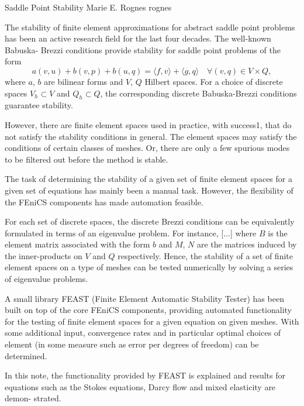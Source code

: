               {Saddle Point Stability}
              {Marie E. Rognes}
              {rognes}

The stability of finite element approximations for abstract saddle point problems
has been an active research field for the last four decades. The well-known Babuska-
Brezzi conditions provide stability for saddle point problems of the form
\begin{equation}
  a(v, u) + b(v, p) + b(u, q) = \langle f, v \rangle + \langle g, q \rangle
  \quad \forall (v, q) \in V \times Q,
\end{equation}
where $a$, $b$ are bilinear forms and $V$, $Q$ Hilbert spaces. For a
choice of discrete spaces $V_h \subset V$ and $Q_h \subset Q$, the
corresponding discrete Babuska-Brezzi conditions guarantee stability.

However, there are finite element spaces used in practice, with
success1, that do not satisfy the stability conditions in general. The
element spaces may satisfy the conditions of certain classes of
meshes. Or, there are only a few spurious modes to be filtered out
before the method is stable.

The task of determining the stability of a given set of finite
element spaces for a given set of equations has mainly been a manual
task. However, the flexibility of the FEniCS components has made
automation feasible.

For each set of discrete spaces, the discrete Brezzi conditions can be
equivalently formulated in terms of an eigenvalue problem. For
instance, [...]  where $B$ is the element matrix associated with the
form $b$ and $M$, $N$ are the matrices induced by the inner-products
on $V$ and $Q$ respectively. Hence, the stability of a set of finite
element spaces on a type of meshes can be tested numerically by
solving a series of eigenvalue problems.

A small library FEAST (Finite Element Automatic Stability Tester) has
been built on top of the core FEniCS components, providing automated
functionality for the testing of finite element spaces for a given
equation on given meshes. With some additional input, convergence
rates and in particular optimal choices of element (in some measure
such as error per degrees of freedom) can be determined.

In this note, the functionality provided by FEAST is explained and
results for equations such as the Stokes equations, Darcy flow and
mixed elasticity are demon- strated.
